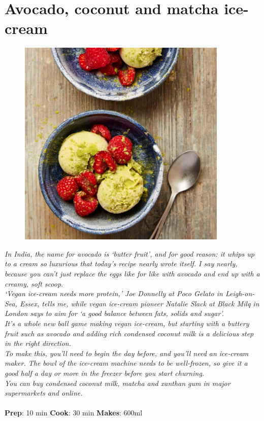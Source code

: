 \documentclass{book}
\begin{document}
\section{Avocado, coconut and matcha ice-cream}
\begin{figure}
\centering\includegraphics[width=10cm,height=10cm,keepaspectratio]{Recipe_Pictures/Avocado,_coconut_and_matcha_ice-cream.png}
\end{figure}
\emph{In India, the name for avocado is ‘butter fruit’, and for good reason: it whips up to a cream so luxurious that today’s recipe nearly wrote itself. I say nearly, because you can’t just replace the eggs like for like with avocado and end up with a creamy, soft scoop. \\ 
‘Vegan ice-cream needs more protein,’ Joe Donnelly at Poco Gelato in Leigh-on-Sea, Essex, tells me, while vegan ice-cream pioneer Natalie Slack at Black Milq in London says to aim for ‘a good balance between fats, solids and sugar’. \\ 
It’s a whole new ball game making vegan ice-cream, but starting with a buttery fruit such as avocado and adding rich condensed coconut milk is a delicious step in the right direction.\\ 
To make this, you’ll need to begin the day before, and you’ll need an ice-cream maker. The bowl of the ice-cream machine needs to be well-frozen, so give it a good half a day or more in the freezer before you start churning. \\ 
You can buy condensed coconut milk, matcha and xanthan gum in major supermarkets and online.}\\\\ 
\textbf{Prep}: 10 min
\textbf{Cook}: 30 min
\textbf{Makes}: 600ml
\end{document}
